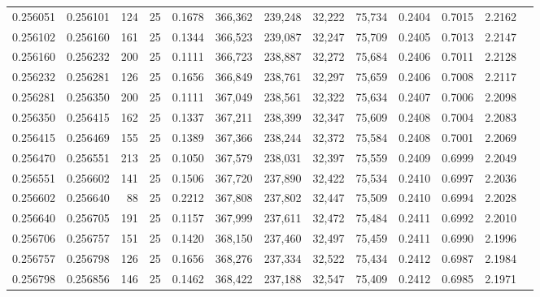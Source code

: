 \begin{tabular}{rrrrrrrrrrrrr}
0.256051 & 0.256101 &   124 &  25 &                                     0.1678 & 366,362 & 239,248 &  32,222 &  75,734 & 0.2404 & 0.7015 & 2.2162 \\
0.256102 & 0.256160 &   161 &  25 &                                     0.1344 & 366,523 & 239,087 &  32,247 &  75,709 & 0.2405 & 0.7013 & 2.2147 \\
0.256160 & 0.256232 &   200 &  25 &                                     0.1111 & 366,723 & 238,887 &  32,272 &  75,684 & 0.2406 & 0.7011 & 2.2128 \\
0.256232 & 0.256281 &   126 &  25 &                                     0.1656 & 366,849 & 238,761 &  32,297 &  75,659 & 0.2406 & 0.7008 & 2.2117 \\
0.256281 & 0.256350 &   200 &  25 &                                     0.1111 & 367,049 & 238,561 &  32,322 &  75,634 & 0.2407 & 0.7006 & 2.2098 \\
0.256350 & 0.256415 &   162 &  25 &                                     0.1337 & 367,211 & 238,399 &  32,347 &  75,609 & 0.2408 & 0.7004 & 2.2083 \\
0.256415 & 0.256469 &   155 &  25 &                                     0.1389 & 367,366 & 238,244 &  32,372 &  75,584 & 0.2408 & 0.7001 & 2.2069 \\
0.256470 & 0.256551 &   213 &  25 &                                     0.1050 & 367,579 & 238,031 &  32,397 &  75,559 & 0.2409 & 0.6999 & 2.2049 \\
0.256551 & 0.256602 &   141 &  25 &                                     0.1506 & 367,720 & 237,890 &  32,422 &  75,534 & 0.2410 & 0.6997 & 2.2036 \\
0.256602 & 0.256640 &    88 &  25 &                                     0.2212 & 367,808 & 237,802 &  32,447 &  75,509 & 0.2410 & 0.6994 & 2.2028 \\
0.256640 & 0.256705 &   191 &  25 &                                     0.1157 & 367,999 & 237,611 &  32,472 &  75,484 & 0.2411 & 0.6992 & 2.2010 \\
0.256706 & 0.256757 &   151 &  25 &                                     0.1420 & 368,150 & 237,460 &  32,497 &  75,459 & 0.2411 & 0.6990 & 2.1996 \\
0.256757 & 0.256798 &   126 &  25 &                                     0.1656 & 368,276 & 237,334 &  32,522 &  75,434 & 0.2412 & 0.6987 & 2.1984 \\
0.256798 & 0.256856 &   146 &  25 &                                     0.1462 & 368,422 & 237,188 &  32,547 &  75,409 & 0.2412 & 0.6985 & 2.1971 \\

\end{tabular}
